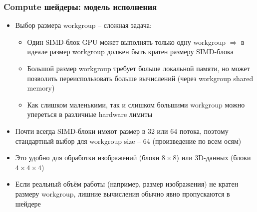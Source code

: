 \documentclass[10pt]{beamer}
\begin{document}
\begin{frame}[fragile]
\frametitle{Compute шейдеры: модель исполнения}
\begin{itemize}
\item Выбор размера workgroup -- сложная задача:
\pause
\begin{itemize}
\item Один SIMD-блок GPU может выполнять только одну workgroup \(\Longrightarrow\) в идеале размер workgroup должен быть кратен размеру SIMD-блока
\pause
\item Большой размер workgroup требует больше локальной памяти, но может позволить переиспользовать больше вычислений (через workgroup shared memory)
\pause
\item Как слишком маленькими, так и слишком большими workgroup можно упереться в различные hardware лимиты
\end{itemize}
\pause
\item Почти всегда SIMD-блоки имеют размер в 32 или 64 потока, поэтому стандартный выбор для workgroup size -- 64 (произведение по всем осям)
\pause
\item Это удобно для обработки изображений (блоки \(8\times 8\)) или 3D-данных (блоки \(4\times 4\times 4\))
\pause
\item Если реальный объём работы (например, размер изображения) не кратен размеру workgroup, лишние вычисления обычно явно пропускаются в шейдере
\end{itemize}
\end{frame}
\end{document}
